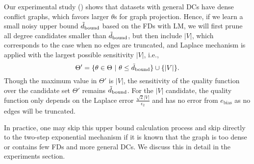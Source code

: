 Our experimental study () shows that datasets with general DCs have dense conflict graphs, which favors larger $\theta$s for graph projection. Hence, if we learn a small noisy upper bound  $\tilde{d}_{\normalfont{\text{bound}}}$ based on the FDs with LM, we will first prune all degree candidates smaller than $\tilde{d}_{\normalfont{\text{bound}}}$, but then include $|V|$, which corresponds to the case when no edges are truncated, and Laplace mechanism is applied with the largest possible sensitivity $|V|$, i.e., 
\begin{equation}\label{eq:fd-bound}
    \Theta' = \{\theta\in \Theta~|~\theta \leq \tilde{d}_{\normalfont{\text{bound}}}\} \cup \{|V|\}.
\end{equation}
Though the maximum value in $\Theta'$ is $|V|$, the sensitivity of the quality function over the candidate set $\Theta'$ remains $\tilde{d}_{\normalfont{\text{bound}}}$. For the $|V|$ candidate, the quality function only depends on the Laplace error $\frac{\sqrt{2}|V|}{\epsilon_2}$ and has no error from $e_{\text{bias}}$ as no edges will be truncated. 

In practice, one may skip this upper bound calculation process and skip directly to the two-step exponential mechanism if it is known that the graph is too dense or contains few FDs and more general DCs. We discuss this in detail in the experiments section. 


